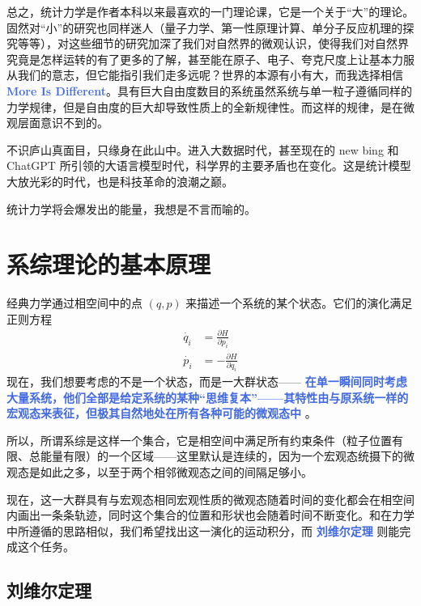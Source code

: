 \documentclass[hyperref,UTF-8]{ctexbook}
\newcommand{\0}{\boldsymbol{0}}
\begin{document}
总之，统计力学是作者本科以来最喜欢的一门理论课，它是一个关于“大”的理论。固然对“小”的研究也同样迷人（量子力学、第一性原理计算、单分子反应机理的探究等等），对这些细节的研究加深了我们对自然界的微观认识，使得我们对自然界究竟是怎样运转的有了更多的了解，甚至能在原子、电子、夸克尺度上让基本力服从我们的意志，但它能指引我们走多远呢？世界的本源有小有大，而我选择相信 \textcolor{RoyalBlue}{\textbf{\kaishu More Is Different}}。具有巨大自由度数目的系统虽然系统与单一粒子遵循同样的力学规律，但是自由度的巨大却导致性质上的全新规律性。而这样的规律，是在微观层面意识不到的。

不识庐山真面目，只缘身在此山中。进入大数据时代，甚至现在的 new bing 和 ChatGPT 所引领的大语言模型时代，科学界的主要矛盾也在变化。这是统计模型大放光彩的时代，也是科技革命的浪潮之巅。

统计力学将会爆发出的能量，我想是不言而喻的。

\pagebreak 


\chapter{系综理论的基本原理}\label{cha:系综理论的基本原理}

经典力学通过相空间中的点 $(q,p)$ 来描述一个系统的某个状态。它们的演化满足正则方程
\begin{align*}
    \dot{q_i} &= \frac{\partial H}{\partial p_i} \\
    \dot{p_i} &= -\frac{\partial H}{\partial q_i}
\end{align*}
现在，我们想要考虑的不是一个状态，而是一大群状态——  \textcolor{RoyalBlue}{\textbf{\kaishu 在单一瞬间同时考虑大量系统，他们全部是给定系统的某种“思维复本”——其特性由与原系统一样的宏观态来表征，但极其自然地处在所有各种可能的微观态中}} \cite{Pathria}。

所以，所谓系综是这样一个集合，它是相空间中满足所有约束条件（粒子位置有限、总能量有限）的一个区域——这里默认是连续的，因为一个宏观态统摄下的微观态是如此之多，以至于两个相邻微观态之间的间隔足够小。

现在，这一大群具有与宏观态相同宏观性质的微观态随着时间的变化都会在相空间内画出一条条轨迹，同时这个集合的位置和形状也会随着时间不断变化。和在力学中所遵循的思路相似，我们希望找出这一演化的运动积分，而 \textcolor{RoyalBlue}{\textbf{\kaishu 刘维尔定理}} 则能完成这个任务。

\section{刘维尔定理}\label{sec:刘维尔定理}
\end{document}

